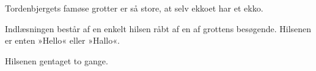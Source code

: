 
Tordenbjergets famøse grotter er så store, at selv ekkoet har et ekko.

\begin{Input}
  Indlæsningen består af en enkelt hilsen råbt af en af grottens besøgende.
  Hilsenen er enten »Hello« eller »Hallo«.
\end{Input}

\begin{Output}
  Hilsenen gentaget to gange.
\end{Output}

